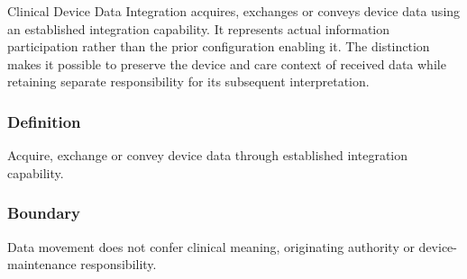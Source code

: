Clinical Device Data Integration acquires, exchanges or conveys device data using an established integration capability. It represents actual information participation rather than the prior configuration enabling it. The distinction makes it possible to preserve the device and care context of received data while retaining separate responsibility for its subsequent interpretation.

\subsubsection*{Definition}

Acquire, exchange or convey device data through established integration capability.

\subsubsection*{Boundary}

Data movement does not confer clinical meaning, originating authority or device-maintenance responsibility.

